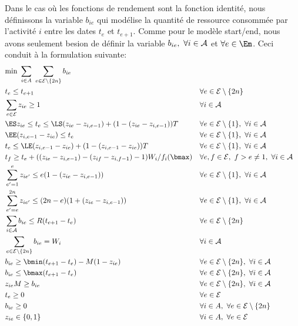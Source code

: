 Dans le cas où les fonctions de rendement sont la fonction identité,
nous définissons la variable $b_{ie}$ qui modélise la quantité de
ressource consommée par l'activité $i$ entre les dates $t_e$ et
$t_{e+1}$. Comme pour le modèle start/end, nous avons seulement besion
de définir la variable $b_{ie},\ \forall i \in {\cal A}$ et $\forall e \in
\Em$. Ceci conduit à la formulation suivante: 
{\small
\begin{align}
& \text{min } \sum_{i\in A}\ \sum_{e\in \E\setminus
    \{2n\}}b_{ie}
 \label{obj_CECSP_OO}\\ 
&t_e \le t_{e+1} & &\forall e \in \E\setminus
 \{2n\} \label{ordre_CECSP_OO}\\
&\sum_{e \in \E} z_{ie} \ge 1 & & \forall i \in {\cal
   A}\label{start_CECSP_OO}\\
& \ES z_{ie}\le t_e \le \LS(z_{ie}-z_{i,e-1})+(1-(z_{ie}-z_{i,e-1}))T
 & & \forall e \in \E\setminus \{1\},\ \forall i \in {\cal
   A}\label{twx_CECSP_OO}\\
&\EE(z_{i,e-1}-z_{ie})\le t_e & & \forall e \in \E\setminus
 \{1\},\ \forall i \in \A\label{twy1_CECSP_OO}\\
&t_e \le \LE(z_{i,e-1}-z_{ie})+(1-(z_{i,e-1}-z_{ie}))T & & \forall e
 \in \E\setminus \{1\},\ \forall i \in {\cal
   A}\label{twy2_CECSP_OO}\\
&t_f\ge t_e +((z_{ie}-z_{i,e-1})-(z_{if}-z_{i,f-1})-1)W_i/f_i(\bmax) &
 & \forall e,f \in \E,\ f>e\neq 1,\ \forall i \in {\cal
   A} \label{dur_CECSP_OO}\\
&\sum_{e'=1}^{e} z_{ie'} \le e(1-(z_{ie}-z_{i,e-1})) & & \forall e \in
       \E\setminus \{1\},\ \forall i \in \A
\label{preem1_CECSP_OO}\\
&\sum_{e'=e}^{2n} z_{ie'} \le (2n-e)(1+(z_{ie}-z_{i,e-1})) & & \forall
e \in \E\setminus \{1\},\ \forall i \in \A
\label{preem2_CECSP_OO}\\
&\sum_{i\in \A} b_{ie} \le R(t_{e+1}-t_e) & & \forall e \in
      \E\setminus \{2n\}\label{res_CECSP_OO}\\
&\sum_{e \in \E\setminus \{2n\}} b_{ie} = W_i & & \forall i \in
        \A\label{nrj_CECSP_OO}\\
&b_{ie} \ge \bmin(t_{e+1}-t_e) - M(1-z_{ie}) & & \forall e \in {\cal
  E}\setminus \{2n\}, \ \forall i \in \A\label{bmin_CECSP_OO}\\
&b_{ie} \le \bmax(t_{e+1}-t_e) & &\forall e \in \E\setminus
\{2n\},\ \forall i \in \A\label{bmax_CECSP_OO}\\
&z_{ie}M\ge b_{ie} & & \forall e\in \E\setminus \{2n\},
\ \forall i \in \A\label{res0_CECSP_OO}\\
&t_e \ge 0 & & \forall e \in \E \label{eq54}\\
& b_{ie} \ge 0 & & \forall i \in A,\ \forall e \in \E\setminus
\{2n\}
 \label{Bb_CECSP_OO}\\
&z_{ie} \in \{0,1\} & & \forall i \in A,\ \forall e \in {\cal
   E} \label{eq57}
\end{align}
}
